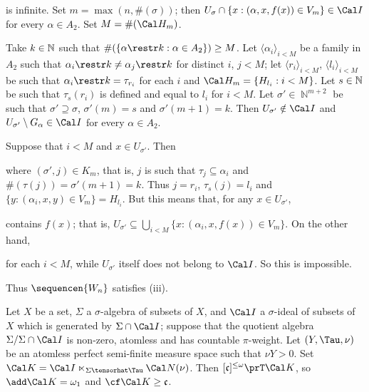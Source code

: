 {

\noindent is infinite.   Set $m=\max(n,\#(\sigma))$;  then
$U_{\sigma}\cap\{x:(\alpha,x,f(x))\in V_m\}\in\Cal I$ for every
$\alpha\in A_2$.   Set $M=\#(\Cal H_m)$.

Take $k\in\Bbb N$ such that $\#(\{\alpha\restr k:\alpha\in A_2\})\ge M$.
Let $\langle\alpha_i\rangle_{i<M}$ be a family in $A_2$ such that
$\alpha_i\restr k\ne\alpha_j\restr k$ for distinct $i$, $j<M$;  let
$\langle r_i\rangle_{i<M}$, $\langle l_i\rangle_{i<M}$ be such that
$\alpha_i\restr k=\tau_{r_i}$ for each $i$ and
$\Cal H_m=\{H_{l_i}:i<M\}$.
Let $s\in\Bbb N$ be such that $\tau_s(r_i)$ is defined and equal to
$l_i$ for $i<M$.   Let $\sigma'\in\BbbN^{m+2}$ be such that
$\sigma'\supseteq\sigma$, $\sigma'(m)=s$ and $\sigma'(m+1)=k$.   Then
$U_{\sigma'}\notin\Cal I$ and
$U_{\sigma'}\setminus G_{\alpha}\in\Cal I$ for every $\alpha\in A_2$.

Suppose that $i<M$ and $x\in U_{\sigma'}$.   Then


\noindent where $(\sigma',j)\in K_m$, that is, $j$ is such that
$\tau_j\subseteq\alpha_i$ and $\#(\tau(j))=\sigma'(m+1)=k$.   Thus
$j=r_i$, $\tau_s(j)=l_i$ and
$\{y:(\alpha_i,x,y)\in V_m\}=H_{l_i}$.   But this means that, for any
$x\in U_{\sigma'}$,


\noindent contains $f(x)$;  that is,
$U_{\sigma'}\subseteq\bigcup_{i<M}\{x:(\alpha_i,x,f(x))\in V_m\}$.
On the other hand,


\noindent for each $i<M$, while $U_{\sigma'}$ itself does not belong to
$\Cal I$.   So this is impossible.\ \Bang

Thus $\sequencen{W_n}$ satisfies (iii).
}%

 Let $X$ be a set, $\Sigma$ a $\sigma$-algebra of
subsets of $X$, and $\Cal I$ a $\sigma$-ideal of subsets of $X$ which is
generated by $\Sigma\cap\Cal I$;  suppose that the quotient algebra
$\Sigma/\Sigma\cap\Cal I$ is non-zero, atomless and has countable
$\pi$-weight.
Let $(Y,\Tau,\nu)$ be an atomless perfect semi-finite measure space such that
$\nu Y>0$.    Set
$\Cal K=\Cal I\ltimes_{\Sigma\tensorhat\Tau}\Cal N(\nu)$.   Then
$[\frak c]^{\le\omega}\prT\Cal K$, so $\add\Cal K=\omega_1$ and
$\cf\Cal K\ge\frak c$.

